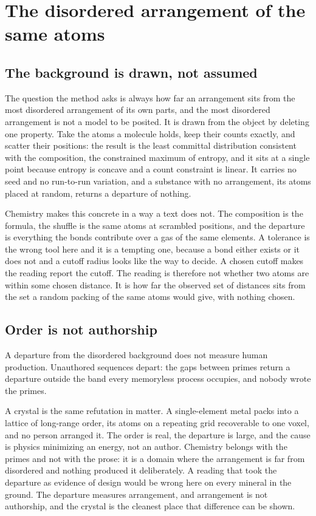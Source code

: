\chapter{The disordered arrangement of the same atoms}

\section{The background is drawn, not assumed}

The question the method asks is always how far an arrangement sits from the most disordered
arrangement of its own parts, and the most disordered arrangement is not a model to be posited. It is
drawn from the object by deleting one property. Take the atoms a molecule holds, keep their counts
exactly, and scatter their positions: the result is the least committal distribution consistent with
the composition, the constrained maximum of entropy, and it sits at a single point because entropy is
concave and a count constraint is linear. It carries no seed and no run-to-run variation, and a
substance with no arrangement, its atoms placed at random, returns a departure of nothing.

Chemistry makes this concrete in a way a text does not. The composition is the formula, the shuffle
is the same atoms at scrambled positions, and the departure is everything the bonds contribute over a
gas of the same elements. A tolerance is the wrong tool here and it is a tempting one, because a bond
either exists or it does not and a cutoff radius looks like the way to decide. A chosen cutoff makes
the reading report the cutoff. The reading is therefore not whether two atoms are within some chosen
distance. It is how far the observed set of distances sits from the set a random packing of the same
atoms would give, with nothing chosen.

\section{Order is not authorship}

A departure from the disordered background does not measure human production. Unauthored sequences
depart: the gaps between primes return a departure outside the band every memoryless process
occupies, and nobody wrote the primes.

A crystal is the same refutation in matter. A single-element metal packs into a lattice of long-range
order, its atoms on a repeating grid recoverable to one voxel, and no person arranged it. The order
is real, the departure is large, and the cause is physics minimizing an energy, not an author.
Chemistry belongs with the primes and not with the prose: it is a domain where the arrangement is far
from disordered and nothing produced it deliberately. A reading that took the departure as evidence of
design would be wrong here on every mineral in the ground. The departure measures arrangement, and
arrangement is not authorship, and the crystal is the cleanest place that difference can be shown.

